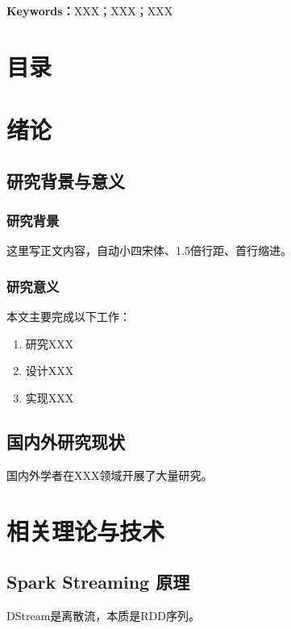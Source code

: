 \vspace{1em}
\noindent\textbf{Keywords：}XXX；XXX；XXX

\clearpage

\chapter*{\heiti 目\quad 录}
\tableofcontents
\clearpage

\setcounter{page}{1}

\chapter{绪论}
\section{研究背景与意义}
\subsection{研究背景}
这里写正文内容，自动小四宋体、1.5倍行距、首行缩进。

\subsection{研究意义}
本文主要完成以下工作：
\begin{enumerate}[label=(\arabic*)]
    \item 研究XXX
    \item 设计XXX
    \item 实现XXX
\end{enumerate}

\section{国内外研究现状}
国内外学者在XXX领域开展了大量研究\cite{example1}。

\chapter{相关理论与技术}
\section{Spark Streaming 原理}
DStream是离散流，本质是RDD序列。

